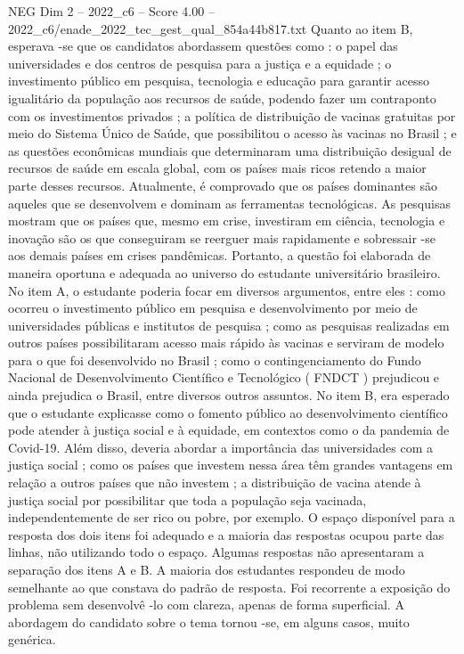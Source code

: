 \begin{textsample}{NEG Dim 2 – 2022\_c6 – Score 4.00 – 2022\_c6/enade\_2022\_tec\_gest\_qual\_854a44b817.txt}
Quanto ao item B, esperava -se que os candidatos abordassem questões como : o papel das universidades e dos centros de pesquisa para a justiça e a equidade ; o investimento público em pesquisa, tecnologia e educação para garantir acesso igualitário da população aos recursos de saúde, podendo fazer um contraponto com os investimentos privados ; a política de distribuição de vacinas gratuitas por meio do Sistema Único de Saúde, que possibilitou o acesso às vacinas no Brasil ; e as questões econômicas mundiais que determinaram uma distribuição desigual de recursos de saúde em escala global, com os países mais ricos retendo a maior parte desses recursos.
Atualmente, é comprovado que os países dominantes são aqueles que se desenvolvem e dominam as ferramentas tecnológicas.
As pesquisas mostram que os países que, mesmo em crise, investiram em ciência, tecnologia e inovação são os que conseguiram se reerguer mais rapidamente e sobressair -se aos demais países em crises pandêmicas.
Portanto, a questão foi elaborada de maneira oportuna e adequada ao universo do estudante universitário brasileiro.
No item A, o estudante poderia focar em diversos argumentos, entre eles : como ocorreu o investimento público em pesquisa e desenvolvimento por meio de universidades públicas e institutos de pesquisa ; como as pesquisas realizadas em outros países possibilitaram acesso mais rápido às vacinas e serviram de modelo para o que foi desenvolvido no Brasil ; como o contingenciamento do Fundo Nacional de Desenvolvimento Científico e Tecnológico ( FNDCT ) prejudicou e ainda prejudica o Brasil, entre diversos outros assuntos.
No item B, era esperado que o estudante explicasse como o fomento público ao desenvolvimento científico pode atender à justiça social e à equidade, em contextos como o da pandemia de Covid-19.
Além disso, deveria abordar a importância das universidades com a justiça social ; como os países que investem nessa área têm grandes vantagens em relação a outros países que não investem ; a distribuição de vacina atende à justiça social por possibilitar que toda a população seja vacinada, independentemente de ser rico ou pobre, por exemplo.
O espaço disponível para a resposta dos dois itens foi adequado e a maioria das respostas ocupou parte das linhas, não utilizando todo o espaço.
Algumas respostas não apresentaram a separação dos itens A e B.
A maioria dos estudantes respondeu de modo semelhante ao que constava do padrão de resposta.
Foi recorrente a exposição do problema sem desenvolvê -lo com clareza, apenas de forma superficial.
A abordagem do candidato sobre o tema tornou -se, em alguns casos, muito genérica.

\end{textsample}
